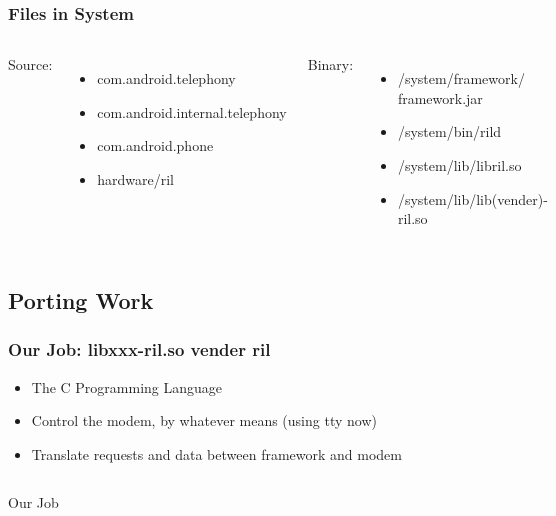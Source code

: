 \documentclass{beamer}
\begin{document}
\begin{frame}
    \frametitle{Files in System}
    \begin{columns}[c]
        \column{2.25in}
            Source:
            \begin{itemize}
                \item com.android.telephony
                \item com.android.internal.telephony
                \item com.android.phone
                \item hardware/ril
            \end{itemize}
            
        \column{2.25in}
        Binary:
        \begin{itemize}
            \item /system/framework/ framework.jar
            \item /system/bin/rild
            \item /system/lib/libril.so
            \item /system/lib/lib(vender)-ril.so
        \end{itemize}
    \end{columns}
\end{frame}

\subsection{Porting Work}
\begin{frame}
    \frametitle{Our Job: libxxx-ril.so vender ril}
    \begin{itemize}
        \item The C Programming Language
        \item Control the modem, by whatever means (using tty now)
        \item Translate requests and data between framework and modem
    \end{itemize}
\end{frame}

\begin{frame}
	\begin{columns}[c]
        \column{0.5in}
        Our Job
        \column{3in}
    \end{columns}
\end{frame}
\end{document}
